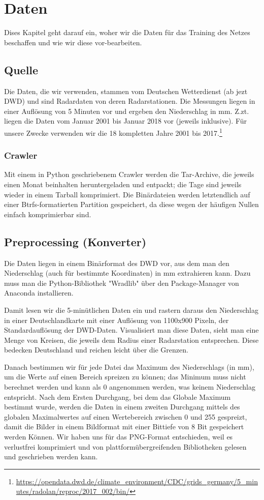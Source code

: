 \section{Daten}
Dises Kapitel geht darauf ein, woher wir die Daten für das Training des Netzes beschaffen und wie wir diese vor-bearbeiten.

\subsection{Quelle}
Die Daten, die wir verwenden, stammen vom Deutschen Wetterdienst (ab jezt DWD) und sind Radardaten von deren Radarstationen. Die Messungen liegen in einer Auflösung von 5 Minuten vor und ergeben den Niederschlag in mm. Z.zt. liegen die Daten vom Januar 2001 bis Januar 2018 vor (jeweils inklusive). Für unsere Zwecke verwenden wir die 18 kompletten Jahre 2001 bis 2017.\footnote{\url{https://opendata.dwd.de/climate\_environment/CDC/grids\_germany/5\_minutes/radolan/reproc/2017\_002/bin/}}

\subsubsection{Crawler}
Mit einem in Python geschriebenem Crawler werden die Tar-Archive, die jeweils einen Monat beinhalten heruntergeladen und entpackt; die Tage sind jeweils wieder in einem Tarball komprimiert. Die Binärdateien werden letztendlich auf einer Btrfs-formatierten Partition gespeichert, da diese wegen der häufigen Nullen einfach komprimierbar sind.

\subsection{Preprocessing (Konverter)}
Die Daten liegen in einem Binärformat des DWD vor, aus dem man den Niederschlag (auch für bestimmte Koordinaten) in mm extrahieren kann. Dazu muss man die Python-Bibliothek "Wradlib" über den Package-Manager von Anaconda installieren.

Damit lesen wir die 5-minütlichen Daten ein und rastern daraus den Niederschlag in einer Deutschlandkarte mit einer Auflösung von 1100x900 Pixeln, der Standardauflösung der DWD-Daten. Visualisiert man diese Daten, sieht man eine Menge von Kreisen, die jeweils dem Radius einer Radarstation entsprechen. Diese bedecken Deutschland und reichen leicht über die Grenzen.

Danach bestimmen wir für jede Datei das Maximum des Niederschlags (in mm), um die Werte auf einen Bereich spreizen zu können; das Minimum muss nicht berechnet werden und kann als 0 angenommen werden, was keinem Niederschlag entspricht.
Nach dem Ersten Durchgang, bei dem das Globale Maximum bestimmt wurde, werden die Daten in einem zweiten Durchgang mittels  des globalen Maximalwertes auf einen Wertebereich zwischen 0 und 255 gespreizt, damit die Bilder in einem Bildformat mit einer Bittiefe von 8 Bit gespeichert werden Können. Wir haben uns für das PNG-Format entschieden, weil es verlustfrei komprimiert und von plattformübergreifenden Bibliotheken gelesen und geschrieben werden kann.

